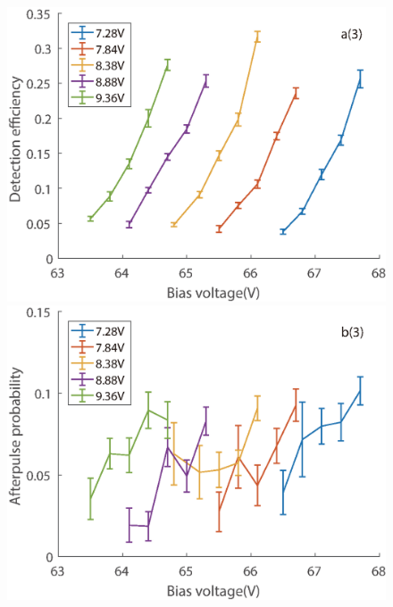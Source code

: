 \documentclass[%
 reprint,
superscriptaddress,
 amsmath,amssymb,
 aps,
]{revtex4-1}
\begin{document}
\begin{figure}
\begin{minipage}{0.24\linewidth}
\centering
\includegraphics[width = 1\textwidth]{figure/100M/efficiency.eps}%
\end{minipage}
\begin{minipage}{0.24\linewidth}
\centering
\includegraphics[width = 1\textwidth]{figure/100M/afterpulse0.eps}%
\end{minipage}
\begin{minipage}{0.24\linewidth}
\centering

\end{minipage}
\end{figure}
\end{document}
